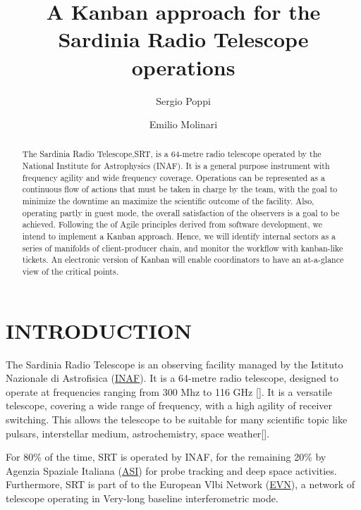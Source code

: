 \documentclass[a4paper]{spie}  %
\title{A Kanban approach for the Sardinia Radio Telescope operations}
\author[a]{Sergio Poppi}
\author[a]{Emilio Molinari}
\affil[a]{INAF Osservatorio Astronomico di Cagliari, Via della Scienza 5, Selargius (CA) , Italy}
\begin{document}
 
\maketitle

\begin{abstract}
The Sardinia Radio Telescope,SRT,  is a 64-metre  radio telescope  operated by the  National Institute for Astrophysics (INAF). It is a general purpose instrument  with frequency agility and wide frequency coverage. 
Operations can be represented as a continuous flow of actions that must be taken in charge by the team, with the goal to minimize  the downtime an maximize the scientific outcome of the facility. Also, operating partly in guest mode, the overall satisfaction of the observers is a goal to be achieved.
Following  the of Agile principles derived from software development, we intend to implement a  Kanban approach. Hence, we will identify internal sectors as a series of  manifolds  of client-producer chain, and monitor the workflow with kanban-like tickets. An electronic version of Kanban will enable coordinators  to have an at-a-glance view of the critical points.
\end{abstract}


\section{INTRODUCTION}
\label{sec:intro}  %



The Sardinia Radio Telescope is an observing facility managed by the Istituto Nazionale di Astrofisica (\href{http://www.inaf.it}{INAF}).  
It is a 64-metre radio telescope, designed to operate  at  frequencies ranging from 300 Mhz to 116 GHz  [\cite{2015JAI.....450008B}].
It is a versatile telescope, covering a wide range of frequency, with a high agility of receiver switching. This  allows the telescope to be suitable for many scientific topic like pulsars, interstellar medium, astrochemistry, space weather[\cite{prandoni}].

For 80\% of the time, SRT is operated by INAF, for  the remaining 20\% by Agenzia Spaziale Italiana (\href{http://www.asi.it}{ASI})  for probe tracking and deep space  activities. 
Furthermore, SRT is part of  to the European Vlbi Network (\href{https://www.evlbi.org/}{EVN}), a network of telescope operating in Very-long baseline interferometric mode.
\end{document}

